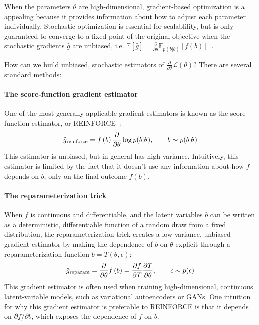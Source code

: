 \documentclass{article}
\newcommand{\PT}{\frac{\partial}{\partial \theta}}
\begin{document}
When the parameters $\theta$ are high-dimensional, gradient-based optimization is a appealing because it provides information about how to adjust each parameter individually.
Stochastic optimization is essential for scalablility, but is only guaranteed to converge to a fixed point of the original objective when the stochastic gradients $\hat g$ are unbiased, i.e. ${\mathbb{E} \left[ \hat g \right] = \PT \mathbb{E}_{p(b|\theta)} \left[ f(b) \right]}$~\citep{robbins1951stochastic}.

How can we build unbiased, stochastic estimators of $\PT \mathcal{L}(\theta)$?
There are several standard methods:

\paragraph{The score-function gradient estimator}
One of the most generally-applicable gradient estimators is known as the score-function estimator, or REINFORCE~\citep{williams1992simple}:
%
\begin{align}
\hat g_\textnormal{reinforce} =  f \left( b \right) \PT \log p(b | \theta), \qquad b \sim p(b | \theta)
\end{align}
%
This estimator is unbiased, but in general has high variance.
Intuitively, this estimator is limited by the fact that it doesn't use any information about how $f$ depends on $b$, only on the final outcome $f(b)$.

\paragraph{The reparameterization trick}
When $f$ is continuous and differentiable, and the latent variables $b$ can be written as a deterministic, differentiable function of a random draw from a fixed distribution, the reparameterization trick \citep{williams1992simple, kingma2013autoencoding, rezende2014stochastic} creates a low-variance, unbiased gradient estimator by making the dependence of $b$ on $\theta$ explicit through a reparameterization function $b=T(\theta, \epsilon)$:
%
\begin{align}
\hat g_\textnormal{reparam}
= \PT f \left( b \right)
= \frac{\partial f}{\partial T}\frac{\partial T}{\partial \theta} , 
\qquad \epsilon \sim p(\epsilon) 
\end{align}
%
This gradient estimator is often used when training high-dimensional, continuous latent-variable models, such as variational autoencoders or GANs.
One intuition for why this gradient estimator is preferable to REINFORCE is that it depends on $\partial f / \partial b$, which exposes the dependence of $f$ on $b$.
\end{document}
